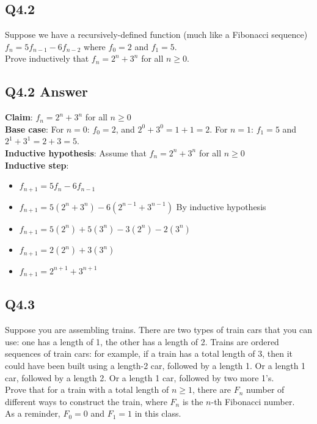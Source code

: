 \documentclass{article}
\begin{document}
\subsection*{Q4.2}
Suppose we have a recursively-defined function (much like a Fibonacci sequence) $f_n=5f_{n-1}-6f_{n-2}$ where $f_0=2$ and $f_1=5$.
\\ Prove inductively that $f_n=2^n+3^n$ for all $n\geq0$.
\newpage
\subsection*{Q4.2 Answer}
\textbf{Claim}: $f_n=2^n+3^n$ for all $n\geq0$
\\ \textbf{Base case}: For $n=0$: $f_0=2$, and $2^0+3^0=1+1=2$. For $n=1$: $f_1=5$ and $2^1+3^1=2+3=5$.
\\ \textbf{Inductive hypothesis}: Assume that $f_n=2^n+3^n$ for all $n\geq0$
\\ \textbf{Inductive step}:
\begin{itemize}[label=]
    \item $f_{n+1}=5f_n-6f_{n-1}$
    \item $f_{n+1}=5(2^n+3^n)-6(2^{n-1}+3^{n-1})$ By inductive hypothesis
    \item $f_{n+1}=5(2^n)+5(3^n)-3(2^n)-2(3^n)$
    \item $f_{n+1}=2(2^n)+3(3^n)$
    \item $f_{n+1}=2^{n+1}+3^{n+1}$
\end{itemize}
\newpage

\subsection*{Q4.3}
Suppose you are assembling trains. There are two types of train cars that you can use: one has a length of 1, the other has a length of 2. Trains are ordered sequences of train cars: for example, if a train has a total length of 3, then it could have been built using a length-2 car, followed by a length 1. Or a length 1 car, followed by a length 2. Or a length 1 car, followed by two more 1's.
\\ Prove that for a train with a total length of $n\geq1$, there are $F_n$ number of different ways to construct the train, where $F_n$ is the $n$-th Fibonacci number.
\\ As a reminder, $F_0=0$ and $F_1=1$ in this class.
\newpage
\end{document}
